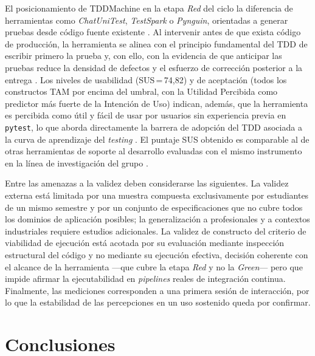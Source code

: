 \documentclass[10pt,journal,twoside,letterpaper]{IEEEtran}
\begin{document}
	El posicionamiento de TDDMachine en la etapa \emph{Red} del ciclo la diferencia de herramientas como \emph{ChatUniTest}, \emph{TestSpark} o \emph{Pynguin}, orientadas a generar pruebas desde código fuente existente \cite{chen2024chatunitest,sapozhnikov2024testspark,lukasczyk2022pynguin}. Al intervenir antes de que exista código de producción, la herramienta se alinea con el principio fundamental del TDD de escribir primero la prueba y, con ello, con la evidencia de que anticipar las pruebas reduce la densidad de defectos y el esfuerzo de corrección posterior a la entrega \cite{nagappan2008tdd,rafique2013meta,erdogmus2005testfirst}. Los niveles de usabilidad (SUS\,=\,74,82) y de aceptación (todos los constructos TAM por encima del umbral, con la Utilidad Percibida como predictor más fuerte de la Intención de Uso) indican, además, que la herramienta es percibida como útil y fácil de usar por usuarios sin experiencia previa en \texttt{pytest}, lo que aborda directamente la barrera de adopción del TDD asociada a la curva de aprendizaje del \emph{testing} \cite{ghafari2020inconclusive,bangor2009sus,davis1989tam}. El puntaje SUS obtenido es comparable al de otras herramientas de soporte al desarrollo evaluadas con el mismo instrumento en la línea de investigación del grupo \cite{guerrero2025tddtool}.
	
	Entre las amenazas a la validez deben considerarse las siguientes. La validez externa está limitada por una muestra compuesta exclusivamente por estudiantes de un mismo semestre y por un conjunto de especificaciones que no cubre todos los dominios de aplicación posibles; la generalización a profesionales y a contextos industriales requiere estudios adicionales. La validez de constructo del criterio de viabilidad de ejecución está acotada por su evaluación mediante inspección estructural del código y no mediante su ejecución efectiva, decisión coherente con el alcance de la herramienta ---que cubre la etapa \emph{Red} y no la \emph{Green}--- pero que impide afirmar la ejecutabilidad en \emph{pipelines} reales de integración continua. Finalmente, las mediciones corresponden a una primera sesión de interacción, por lo que la estabilidad de las percepciones en un uso sostenido queda por confirmar.
	
	\section{Conclusiones}
	\label{sec:conclusiones}
	
\end{document}
